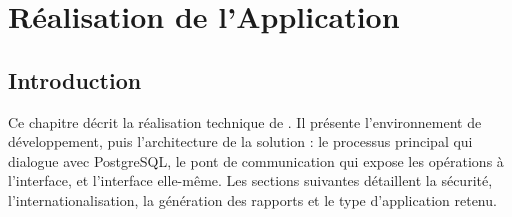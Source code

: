 \chapter{Réalisation de l'Application}

\section{Introduction}
Ce chapitre décrit la réalisation technique de \appname. Il présente l'environnement de développement,
puis l'architecture de la solution : le processus principal qui dialogue avec PostgreSQL, le pont de
communication qui expose les opérations à l'interface, et l'interface elle-même. Les sections suivantes
détaillent la sécurité, l'internationalisation, la génération des rapports et le type d'application
retenu.

